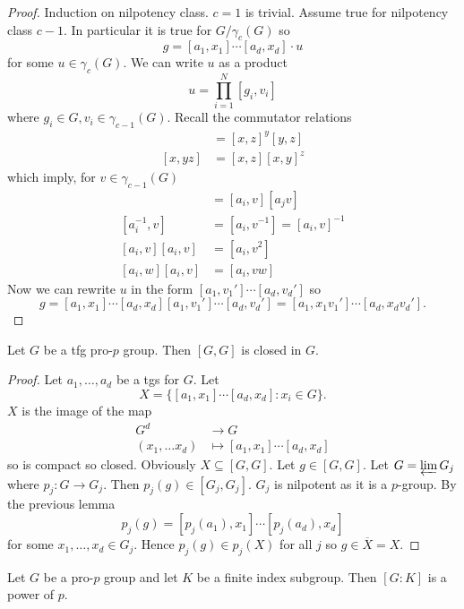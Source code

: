 \documentclass[a4paper]{article}
\begin{document}
\begin{proof}
  Induction on nilpotency class. \(c = 1\) is trivial. Assume true for nilpotency class \(c - 1\). In particular it is true for \(G/\gamma_c(G)\) so
  \[
    g = [a_1, x_1] \cdots [a_d, x_d] \cdot u
  \]
  for some \(u \in \gamma_c(G)\). We can write \(u\) as a product
  \[
    u = \prod_{i = 1}^N [g_i, v_i]
  \]
  where \(g_i \in G, v_i \in \gamma_{c - 1}(G)\). Recall the commutator relations
  \begin{align*}
    [xy, z] &= [x, z]^y [y, z] \\
    [x, yz] &= [x, z] [x, y]^z
  \end{align*}
  which imply, for \(v \in \gamma_{c - 1}(G)\)
  \begin{align*}
    [a_ia_j, v] &= [a_i, v] [a_j v] \\
    [a_i^{-1}, v] &= [a_i, v^{-1}] = [a_i, v]^{-1} \\
    [a_i, v] [a_i, v] &= [a_i, v^2] \\
    [a_i, w] [a_i, v] &= [a_i, vw]
  \end{align*}
  Now we can rewrite \(u\) in the form \([a_1, v_1'] \cdots [a_d, v_d']\) so
  \[
    g = [a_1, x_1] \cdots [a_d, x_d] [a_1, v_1'] \cdots [a_d, v_d']
    = [a_1, x_1v_1'] \cdots [a_d, x_d v_d'].
  \]
\end{proof}

\begin{proposition}
  Let \(G\) be a tfg pro-\(p\) group. Then \([G, G]\) is closed in \(G\).
\end{proposition}

\begin{proof}
  Let \(a_1, \dots, a_d\) be a tgs for \(G\). Let
  \[
    X = \{[a_1, x_1] \cdots [a_d, x_d]: x_i \in G\}.
  \]
  \(X\) is the image of the map
  \begin{align*}
    G^d &\to G \\
    (x_1, \dots x_d) &\mapsto [a_1, x_1] \cdots [a_d, x_d]
  \end{align*}
  so is compact so closed. Obviously \(X \subseteq [G, G]\). Let \(g \in [G, G]\). Let \(G = \varprojlim G_j\) where \(p_j: G \to G_j\). Then \(p_j(g) \in [G_j, G_j]\). \(G_j\) is nilpotent as it is a \(p\)-group. By the previous lemma
  \[
    p_j(g) = [p_j(a_1), x_1] \cdots [p_j(a_d), x_d]
  \]
  for some \(x_1, \dots, x_d \in G_j\). Hence \(p_j(g) \in p_j(X)\) for all \(j\) so \(g \in \overline X = X\).
\end{proof}

\begin{proposition}
  Let \(G\) be a pro-\(p\) group and let \(K\) be a finite index subgroup. Then \([G: K]\) is a power of \(p\).
\end{proposition}
\end{document}
